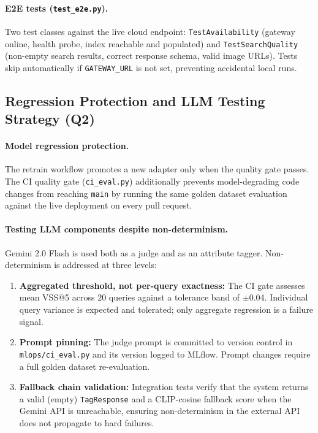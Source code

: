 \documentclass[12pt]{article}
\begin{document}
\paragraph{E2E tests (\texttt{test\_e2e.py}).}
Two test classes against the live cloud endpoint: \texttt{TestAvailability} (gateway online, health probe, index reachable and populated) and \texttt{TestSearchQuality} (non-empty search results, correct response schema, valid image URLs). Tests skip automatically if \texttt{GATEWAY\_URL} is not set, preventing accidental local runs.

\subsection{Regression Protection and LLM Testing Strategy (Q2)}

\paragraph{Model regression protection.}
The retrain workflow promotes a new adapter only when the quality gate passes. The CI quality gate (\texttt{ci\_eval.py}) additionally prevents model-degrading code changes from reaching \texttt{main} by running the same golden dataset evaluation against the live deployment on every pull request.

\paragraph{Testing LLM components despite non-determinism.}
Gemini 2.0 Flash is used both as a judge and as an attribute tagger. Non-determinism is addressed at three levels:

\begin{enumerate}[leftmargin=*]
    \item \textbf{Aggregated threshold, not per-query exactness:} The CI gate assesses mean VSS@5 across 20 queries against a tolerance band of $\pm$0.04. Individual query variance is expected and tolerated; only aggregate regression is a failure signal.
    \item \textbf{Prompt pinning:} The judge prompt is committed to version control in \texttt{mlops/ci\_eval.py} and its version logged to MLflow. Prompt changes require a full golden dataset re-evaluation.
    \item \textbf{Fallback chain validation:} Integration tests verify that the system returns a valid (empty) \texttt{TagResponse} and a CLIP-cosine fallback score when the Gemini API is unreachable, ensuring non-determinism in the external API does not propagate to hard failures.
\end{enumerate}
\end{document}
